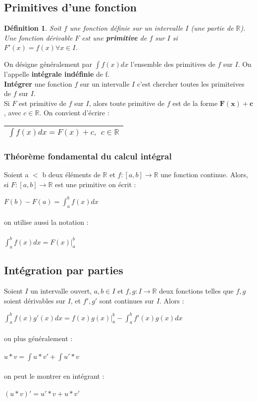 \documentclass[12pt, a4paper]{book}
\newtheorem*{definition}{Définition}
\begin{document}
\subsection{Primitives d'une fonction}
\begin{definition}
    Soit $f$ une fonction définie sur un intervalle $I$ (une partie de $\mathbb{R}$). Une fonction dérivable $F$ est une \textbf{primitive} de $f$ sur $I$ si\\
     $F'(x) = f(x) \forall x \in I$.
\end{definition}
On désigne généralement par $\int f(x)dx$ l'ensemble des primitives de $f$ sur $I$. On l'appelle \textbf{intégrale indéfinie} de f.\\
\textbf{Intégrer} une fonction $f$ sur un intervalle $I$ c'est chercher toutes les primiteives de $f$ sur $I$.\\
Si $F$ est primitive de $f$ sur $I$, alors toute primitive de $f$ est de la forme $\mathbf{F(x)+c}$, avec $c \in \mathbb{R}$. On convient d'écrire :\\
\begin{center}
    \begin{tabular}{ |c|}
        \hline
       $\int f(x)dx = F(x)+c, \ \ c \in \mathbb{R}$\\
        \hline
    \end{tabular}
\end{center}
\subsubsection{Théorème fondamental du calcul intégral}
Soient a $<$ b deux éléments de $\mathbb{R}$ et $f:[a,b]\rightarrow \mathbb{R}$ une fonction continue.
Alors, si $F:[a,b]\rightarrow \mathbb{R}$ est une primitive on écrit :
\begin{center}
    $F(b)-F(a)=\int_{a}^{b} f(x) dx$\\
    \ \\
    on utilise aussi la notation :\\
    \ \\
    $\int_{a}^{b} f(x) dx = F(x)|^b _a$
\end{center}
\subsection{Intégration par parties}
Soient $I$ un intervalle ouvert, $a,b \in I$ et $f,g:I \rightarrow \mathbb{R}$ deux fonctions telles que
$f,g$ soient dérivables sur $I$, et $f',g'$ sont continues sur $I$. Alors :\\
\begin{center}
    $\int_{a}^{b} f(x)g'(x) dx = f(x)g(x)|^b _a- \int_{a}^{b} f'(x)g(x) dx$\\
    \ \\
    ou plus généralement :\\
    \ \\
    $u*v = \int u*v' + \int u'* v$\\
    \ \\
    on peut le montrer en intégrant :\\
    \ \\
    $(u*v)'= u'*v + u*v'$
\end{center}
\end{document}
